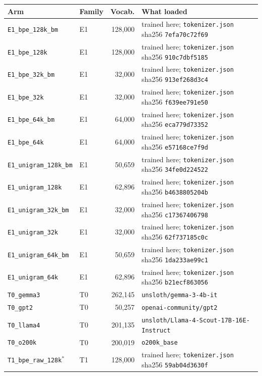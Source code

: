 \begin{table}[t]
\centering
\footnotesize
\begin{tabular}{llrl}
\toprule
Arm & Family & Vocab. & What loaded \\
\midrule
\texttt{E1\_bpe\_128k\_bm} & E1 & 128,000 & trained here; \texttt{tokenizer.json} sha256 \texttt{7efa70c72f69} \\
\texttt{E1\_bpe\_128k} & E1 & 128,000 & trained here; \texttt{tokenizer.json} sha256 \texttt{910c7dbf5185} \\
\texttt{E1\_bpe\_32k\_bm} & E1 & 32,000 & trained here; \texttt{tokenizer.json} sha256 \texttt{913ef268d3c4} \\
\texttt{E1\_bpe\_32k} & E1 & 32,000 & trained here; \texttt{tokenizer.json} sha256 \texttt{f639ee791e50} \\
\texttt{E1\_bpe\_64k\_bm} & E1 & 64,000 & trained here; \texttt{tokenizer.json} sha256 \texttt{eca779d73352} \\
\texttt{E1\_bpe\_64k} & E1 & 64,000 & trained here; \texttt{tokenizer.json} sha256 \texttt{e57168ce7f9d} \\
\texttt{E1\_unigram\_128k\_bm} & E1 & 50,659 & trained here; \texttt{tokenizer.json} sha256 \texttt{34fe0d224522} \\
\texttt{E1\_unigram\_128k} & E1 & 62,896 & trained here; \texttt{tokenizer.json} sha256 \texttt{b4638805204b} \\
\texttt{E1\_unigram\_32k\_bm} & E1 & 32,000 & trained here; \texttt{tokenizer.json} sha256 \texttt{c17367406798} \\
\texttt{E1\_unigram\_32k} & E1 & 32,000 & trained here; \texttt{tokenizer.json} sha256 \texttt{62f737185c0c} \\
\texttt{E1\_unigram\_64k\_bm} & E1 & 50,659 & trained here; \texttt{tokenizer.json} sha256 \texttt{1da233ae99c1} \\
\texttt{E1\_unigram\_64k} & E1 & 62,896 & trained here; \texttt{tokenizer.json} sha256 \texttt{b21ecf863056} \\
\texttt{T0\_gemma3} & T0 & 262,145 & \texttt{unsloth/gemma-3-4b-it} \\
\texttt{T0\_gpt2} & T0 & 50,257 & \texttt{openai-community/gpt2} \\
\texttt{T0\_llama4} & T0 & 201,135 & \texttt{unsloth/Llama-4-Scout-17B-16E-Instruct} \\
\texttt{T0\_o200k} & T0 & 200,019 & \texttt{o200k\_base} \\
\texttt{T1\_bpe\_raw\_128k}$^{*}$ & T1 & 128,000 & trained here; \texttt{tokenizer.json} sha256 \texttt{59ab04d3630f} \\

\end{tabular}
\end{table}
